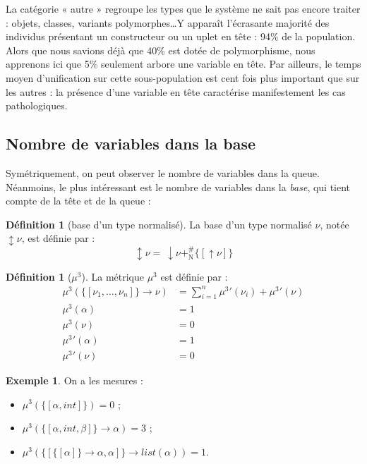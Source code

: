 \documentclass[a4paper]{report}
\theoremstyle{definition}
\newtheorem{definition}[theoreme]{Définition}
\newtheorem{exemple}[theoreme]{Exemple}
\newcommand{\mset}[1]{\{\![#1]\!\}}
\newcommand{\N}{\mathrm{N}}
\begin{document}
La catégorie « autre » regroupe les types que le système ne sait pas encore traiter : objets, classes, variants polymorphes\dots Y apparaît l'écrasante majorité des individus présentant un constructeur ou un uplet en tête : 94\% de la population. Alors que nous savions déjà que 40\% est dotée de polymorphisme, nous apprenons ici que 5\% seulement arbore une variable en tête. Par ailleurs, le temps moyen d'unification sur cette sous-population est cent fois plus important que sur les autres : la présence d'une variable en tête caractérise manifestement les cas pathologiques.


\subsection{Nombre de variables dans la base}

Symétriquement, on peut observer le nombre de variables dans la queue. Néanmoins, le plus intéressant est le nombre de variables dans la \emph{base}, qui tient compte de la tête et de la queue :

\begin{definition}[base d'un type normalisé]
  La base d'un type normalisé $\nu$, notée $\updownarrow \nu$, est définie par :
  \[ \updownarrow \nu =\ \downarrow \nu +^\#_\N \mset{\uparrow \nu} \]
\end{definition}

\begin{definition}[$\mu^3$]
  La métrique $\mu^3$ est définie par :
  \begin{align*}
      \mu^3 (\mset{\nu_1, \dots, \nu_n} \rightarrow \nu) &=
      \sum_{i=1}^n {\mu^3}' (\nu_i) + {\mu^3}' (\nu)
    \\
      \mu^3 (\alpha) &=
      1
    \\
      \mu^3 (\nu) &=
      0
    \\
      {\mu^3}' (\alpha) &=
      1
    \\
      {\mu^3}' (\nu) &=
      0
  \end{align*}
\end{definition}

\begin{exemple}
	On a les mesures :
	\begin{itemize}
		\item $\mu^3 (\mset{\alpha, int}) = 0$ ;
		\item $\mu^3 (\mset{\alpha, int, \beta} \rightarrow \alpha) = 3$ ;
		\item $\mu^3 (\mset{\mset{\alpha} \rightarrow \alpha, \alpha} \rightarrow list (\alpha)) = 1$.
	\end{itemize}
\end{exemple}
\end{document}
